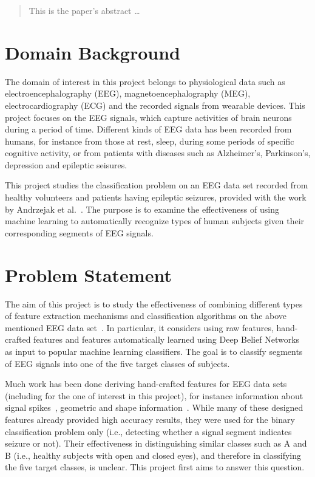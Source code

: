 \documentclass[12pt]{article}
\begin{document}
\maketitle

\begin{abstract}
This is the paper's abstract \ldots
\end{abstract}

\section{Domain Background}

\noindent
The domain of interest in this project belongs to physiological data such as electroencephalography (EEG), magnetoencephalography (MEG), electrocardiography (ECG) and the recorded signals from wearable devices. This project focuses on the EEG signals, which capture activities of brain neurons during a period of time. Different kinds of EEG data has been recorded from humans, for instance from those at rest, sleep, during some periods of specific cognitive activity, or from patients with diseases such as Alzheimer's, Parkinson's, depression and epileptic seisures. 


This project studies the classification problem on an EEG data set recorded from healthy volunteers and patients having epileptic seizures, provided with the work by Andrzejak et al.~\cite{andrzejak2001indications}. The purpose is to examine the effectiveness of using machine learning to automatically recognize types of human subjects given their corresponding segments of EEG signals. 

\section{Problem Statement}

The aim of this project is to study the effectiveness of combining different types of feature extraction mechanisms and classification algorithms on the above mentioned EEG data set~\cite{andrzejak2001indications}. In particular, it considers using raw features, hand-crafted features and features automatically learned using Deep Belief Networks~\cite{hinton2006reducing} as input to popular machine learning classifiers. The goal is to classify segments of EEG signals into one of the five target classes of subjects.

Much work has been done deriving hand-crafted features for EEG data sets (including for the one of interest in this project), for instance information about signal spikes~\cite{nigam2004neural}, geometric and shape information~\cite{wulsin2011modeling}. While many of these designed features already provided high accuracy results, they were used for the binary classification problem only (i.e., detecting whether a signal segment indicates seizure or not). Their effectiveness in distinguishing similar classes such as A and B (i.e., healthy subjects with open and closed eyes), and therefore in classifying the five target classes, is unclear. This project first aims to answer this question.
\end{document}
